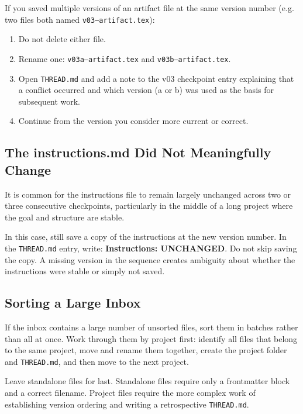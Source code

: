\documentclass[12pt,letterpaper]{article}
\begin{document}
If you saved multiple versions of an artifact file at the same version
number (e.g. two files both named \texttt{v03--artifact.tex}):

\begin{enumerate}
  \item Do not delete either file.

  \item Rename one: \texttt{v03a--artifact.tex} and \texttt{v03b--artifact.tex}.

  \item Open \texttt{THREAD.md} and add a note to the v03 checkpoint entry
        explaining that a conflict occurred and which version (a or b) was
        used as the basis for subsequent work.

  \item Continue from the version you consider more current or correct.
\end{enumerate}

\subsection{The instructions.md Did Not Meaningfully Change}

It is common for the instructions file to remain largely unchanged across
two or three consecutive checkpoints, particularly in the middle of a long
project where the goal and structure are stable.

In this case, still save a copy of the instructions at the new version number.
In the \texttt{THREAD.md} entry, write: \textbf{Instructions: UNCHANGED}.
Do not skip saving the copy. A missing version in the sequence creates ambiguity
about whether the instructions were stable or simply not saved.

\subsection{Sorting a Large Inbox}

If the inbox contains a large number of unsorted files, sort them in batches
rather than all at once. Work through them by project first: identify all files
that belong to the same project, move and rename them together, create the
project folder and \texttt{THREAD.md}, and then move to the next project.

Leave standalone files for last. Standalone files require only a frontmatter
block and a correct filename. Project files require the more complex work of
establishing version ordering and writing a retrospective \texttt{THREAD.md}.
\end{document}
